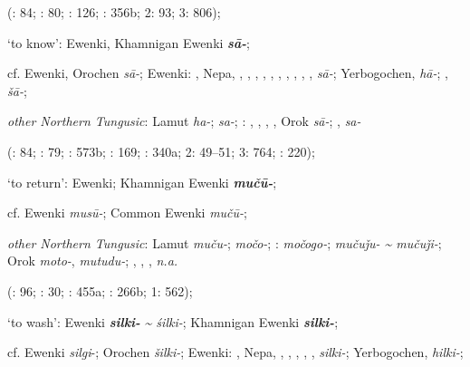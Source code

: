 \documentclass[output=paper,colorlinks,citecolor=brown]{langscibook}
\begin{document}
\begin{xlist}
\begin{xlist}
    (\citealt{Castrén1856}: 84; \citealt{Janhunen1991}: 80; \citealt{Chaoke2017B}: 126; \citealt{Vasilevic1958}: 356b; \citealt{Cincius1975B} 2: 93; \citealt{Hauer1952} 3: 806);

    \ex ‘to know’:  Ewenki, Khamnigan Ewenki \textbf{\textit{sā-}};

    cf.  Ewenki, Orochen \textit{sā-};  Ewenki: , Nepa, , , , , , , , , , ,  \textit{sā-}; Yerbogochen,  \textit{hā-}; ,  \textit{šā-};

    \textit{other Northern Tungusic}: Lamut \textit{ha-};  \textit{sa-}; \textit{}: , , , , Orok \textit{sā-}; ,  \textit{sa-}
    
    (\citealt{Castrén1856}: 84; \citealt{Janhunen1991}: 79; \citealt{Dorji1998}: 573b; \citealt{Chaoke2014a}: 169; \citealt{Vasilevic1958}: 340a; \citealt{Cincius1975B} 2: 49--51; \citealt{Hauer1952} 3: 764; \citealt{Zikmundová2013a}: 220);

    \ex ‘to return’:  Ewenki; Khamnigan Ewenki \textbf{\textit{mučū-}};

    cf.  Ewenki \textit{musū-};  Common Ewenki \textit{mučū-};

    \textit{other Northern Tungusic}: Lamut \textit{muču-};  \textit{močo-}; \textit{}:  \textit{močogo-};  \textit{mučuǰu- {\textasciitilde} mučuǰi-}; Orok \textit{moto-}, \textit{mutudu-}; , , ,  \textit{n.a.} 
    
    (\citealt{Castrén1856}: 96; \citealt{Janhunen1991}: 30; \citealt{Dorji1998}: 455a; \citealt{Vasilevic1958}: 266b; \citealt{Cincius1975B} 1: 562);

    \ex ‘to wash’:  Ewenki \textbf{\textit{silki-}} \textit{{\textasciitilde} śilki-}; Khamnigan Ewenki \textbf{\textit{silki-}};

    cf.  Ewenki \textit{silgi}-; Orochen \textit{šilki-};  Ewenki: , Nepa, , , , , ,  \textit{silki-}; Yerbogochen,  \textit{hilki-};


\end{xlist}
\end{xlist}
\end{document}
